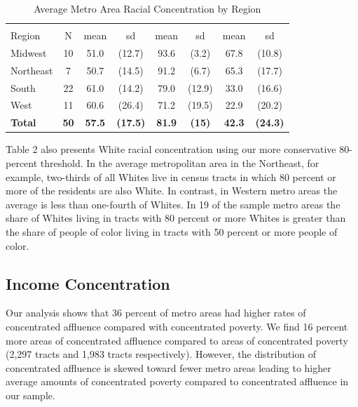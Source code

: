 \documentclass[11pt,]{article}
\begin{document}
\begin{table}[t]

\caption{\label{tab:table2}Average Metro Area Racial Concentration by Region }
\centering
\begin{tabular}{lccccccc}
\toprule
{} &  &  &  \\
\cmidrule(l{3pt}r{3pt}){3-4} \cmidrule(l{3pt}r{3pt}){5-6} \cmidrule(l{3pt}r{3pt}){7-8}
Region & N & mean & sd & mean & sd & mean & sd\\
\midrule
Midwest & 10 & 51.0 & (12.7) & 93.6 & (3.2) & 67.8 & (10.8)\\
Northeast & 7 & 50.7 & (14.5) & 91.2 & (6.7) & 65.3 & (17.7)\\
South & 22 & 61.0 & (14.2) & 79.0 & (12.9) & 33.0 & (16.6)\\
West & 11 & 60.6 & (26.4) & 71.2 & (19.5) & 22.9 & (20.2)\\
\textbf{Total} & \textbf{50} & \textbf{57.5} & \textbf{(17.5)} & \textbf{81.9} & \textbf{(15)} & \textbf{42.3} & \textbf{(24.3)}\\
\bottomrule
\end{tabular}
\end{table}

Table 2 also presents White racial concentration using our more
conservative 80-percent threshold. In the average metropolitan area in
the Northeast, for example, two-thirds of all Whites live in census
tracts in which 80 percent or more of the residents are also White. In
contrast, in Western metro areas the average is less than one-fourth of
Whites. In 19 of the sample metro areas the share of Whites living in
tracts with 80 percent or more Whites is greater than the share of
people of color living in tracts with 50 percent or more people of
color.

\hypertarget{income-concentration}{%
\subsection{Income Concentration}\label{income-concentration}}

Our analysis shows that 36 percent of metro areas had higher rates of
concentrated affluence compared with concentrated poverty. We find 16
percent more areas of concentrated affluence compared to areas of
concentrated poverty (2,297 tracts and 1,983 tracts respectively).
However, the distribution of concentrated affluence is skewed toward
fewer metro areas leading to higher average amounts of concentrated
poverty compared to concentrated affluence in our sample.
\end{document}
